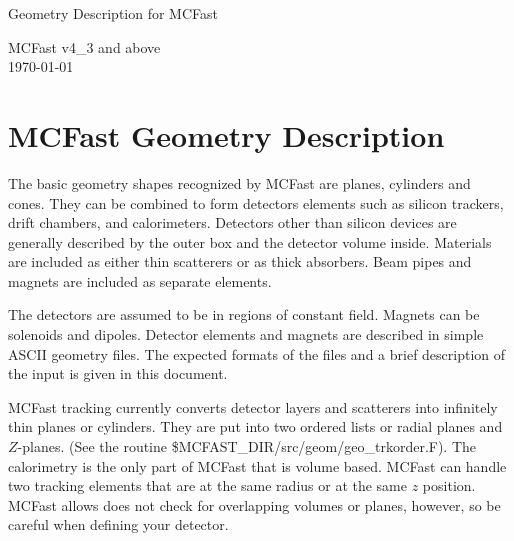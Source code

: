 

\parindent 0pt
\parskip 5mm



\begin{titlepage}




\begin{center}
{\LARGE \sc Geometry Description for MCFast}\\
\end{center}

\begin{abstract}
This document contains a description of MCFast geometry structures and
geometry files.    
\\

\end{abstract}
\begin{center}
MCFast v4\_3 and above \\
\today\\
\end{center}
\end{titlepage}

\tableofcontents

\section{MCFast Geometry Description}

The basic geometry shapes recognized by MCFast are planes, cylinders and cones. They can
be combined to form detectors elements such as silicon trackers, drift chambers, and
calorimeters.  Detectors other than silicon devices are generally described by the outer
box and the detector volume inside.  Materials are included  as either thin scatterers
or as thick absorbers.   Beam pipes and magnets are included as separate elements.

The detectors are assumed to be in regions of constant field.  
Magnets can be solenoids and dipoles.   Detector elements and magnets are described in
simple ASCII geometry files.  The expected formats of the files and a brief description
of the input is given in this document. 

MCFast tracking currently converts detector layers and scatterers into infinitely thin
planes or cylinders.  They are put into two ordered lists or radial planes and
$Z$-planes.  (See the routine 
\$MCFAST\_DIR/src/geom/geo\_trkorder.F).   
The calorimetry is the only part of MCFast that is volume based.   MCFast can handle
two tracking elements that are at the same radius or at the same $z$ position.  
MCFast allows does not check for overlapping volumes or planes, however, so be careful when
defining your detector.  

